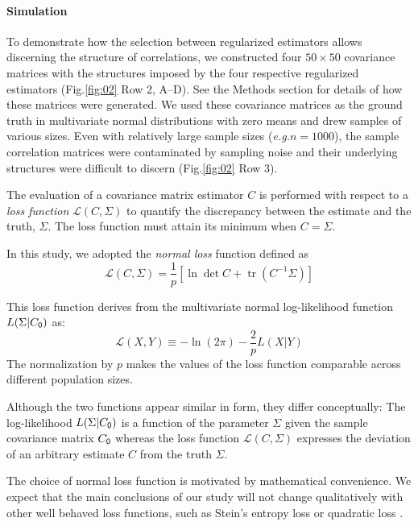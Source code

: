 \documentclass[10pt]{article}
\DeclareMathOperator{\Tr}{tr}
\newcommand{\figref}[2]{Fig.\;\ref{fig:#1}\,#2}
\newcommand{\loss}[1]{\mathcal L\left(#1\right)}
\newcommand{\eg}{\emph{e.g.}\;}
\begin{document}
\paragraph{Simulation}
To demonstrate how the selection between regularized estimators allows discerning the structure of correlations, we constructed four $50\times 50$ covariance matrices with the structures imposed by the four respective regularized estimators (\figref{02}{\,Row 2, A--D}).  See the Methods section for details of how these matrices were generated.  We used these covariance matrices as the ground truth in multivariate normal distributions with zero means and drew samples of various sizes. Even with relatively large sample sizes (\eg $n=1000$), the sample correlation matrices were contaminated by sampling noise and their underlying structures were difficult to discern (\figref{02}{\,Row 3}). 

The evaluation of a covariance matrix estimator $C$ is performed with respect to a \emph{loss function} $\loss{C,\Sigma}$ to quantify the discrepancy between the estimate and the truth, $\Sigma$.  The loss function must attain its minimum when $C=\Sigma$.

In this study, we adopted the \emph{normal loss} function defined as
\begin{equation}\label{eq:loss}
    \loss{C,\Sigma} = \frac 1 p\left[\ln \det C + \Tr(C^{-1}\Sigma)\right]
\end{equation}

This loss function derives from the multivariate normal log-likelihood function $L(\Sigma|C_{\sf 0})$ as:
\begin{equation}
     \loss{X,Y} \equiv -\ln(2\pi) - \frac 2 p L(X|Y)
\end{equation}
The normalization by $p$ makes the values of the loss function comparable across different population sizes.

Although the two functions appear similar in form, they differ conceptually: The log-likelihood $L(\Sigma|C_{\sf 0})$ is a function of the parameter $\Sigma$ given the sample covariance matrix $C_{\sf 0}$ whereas the loss function $\loss{C,\Sigma}$ expresses the deviation of an arbitrary estimate $C$ from the truth $\Sigma$.

The choice of normal loss function is motivated by mathematical convenience. We expect that the main conclusions of our study will not change qualitatively with other well behaved loss functions, such as Stein's entropy loss or quadratic loss \cite{James:1961, Fan:2008, Ledoit:2004, Schafer:2005}.  
\end{document}
